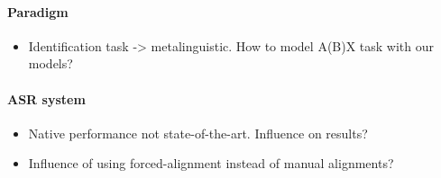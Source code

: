 \paragraph{Paradigm}
\begin{itemize}
  \item Identification task -> metalinguistic. How to model A(B)X task with our models?
  \end{itemize}

\paragraph{ASR system}
\begin{itemize}
\item Native performance not state-of-the-art. Influence on results?
  \item Influence of using forced-alignment instead of manual alignments? 
  \end{itemize}

  
